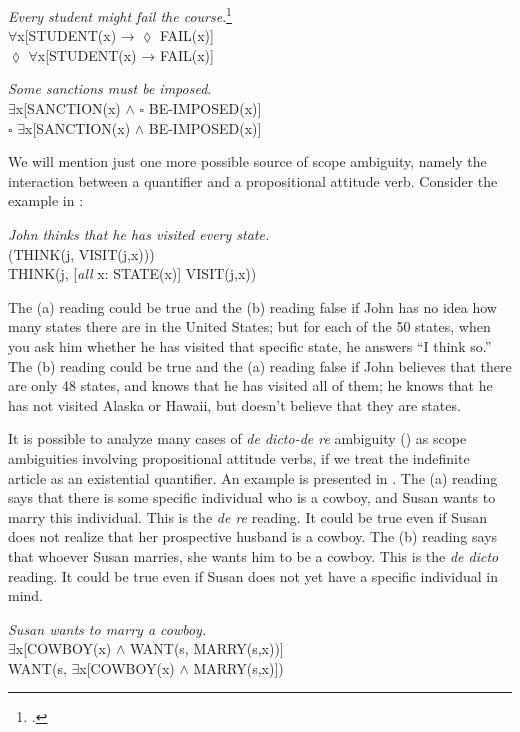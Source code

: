 \ea
\textit{Every student might fail the course}.\footnote{\citet[48]{Abbott2010}.}\\
\ex ${\forall}$x[STUDENT(x) → ${\lozenge}$ FAIL(x)]\\
\ex ${\lozenge}$ ${\forall}$x[STUDENT(x) → FAIL(x)]
\z

\ea
\textit{Some sanctions must be imposed}.\\
\ex ${\exists}$x[SANCTION(x) $\wedge$ ${\square}$ BE-IMPOSED(x)]\\
\ex ${\square}$ ${\exists}$x[SANCTION(x) $\wedge$ BE-IMPOSED(x)]
\z


We will mention just one more possible source of scope ambiguity, namely the interaction between a quantifier and a propositional attitude verb. Consider the example in :


\ea
\textit{John thinks that he has visited every state.}\\
 (THINK(j, VISIT(j,x)))\\
\ex  THINK(j, [\textit{all} x: STATE(x)] VISIT(j,x))
                       \z
\z


The (a) reading could be true and the (b) reading false if John has no idea how many states there are in the United States; but for each of the 50 states, when you ask him whether he has visited that specific state, he answers “I think so.” The (b) reading could be true and the (a) reading false if John believes that there are only 48 states, and knows that he has visited all of them; he knows that he has not visited Alaska or Hawaii, but doesn’t believe that they are states.



It is possible to analyze many cases of \textit{de dicto-de re} ambiguity () as scope ambiguities involving propositional attitude verbs, if we treat the indefinite article as an existential quantifier. An example is presented in . The (a) reading says that there is some specific individual who is a cowboy, and Susan wants to marry this individual. This is the \textit{de re} reading. It could be true even if Susan does not realize that her prospective husband is a cowboy. The (b) reading says that whoever Susan marries, she wants him to be a cowboy. This is the \textit{de dicto} reading. It could be true even if Susan does not yet have a specific individual in mind.


\ea
\textit{Susan wants to marry a cowboy.}\\
\ea  ${\exists}$x[COWBOY(x) $\wedge$ WANT(s, MARRY(s,x))]\\
\ex  WANT(s, ${\exists}$x[COWBOY(x) $\wedge$ MARRY(s,x)])
                       \z
\z


